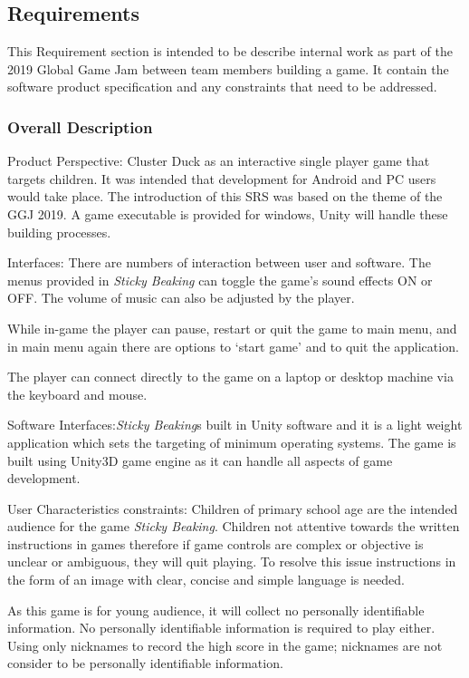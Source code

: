 \documentclass[12pt]{article}
\newcommand{\game}[2]{\textit{#1}}{}
\begin{document}
\subsection{Requirements}
This Requirement section is intended to be describe internal work as part of the 2019 Global Game Jam between team members building a game. It contain the software product specification and any constraints that need to be addressed. \cite{SRS}

\subsubsection{Overall Description}
Product Perspective: Cluster Duck as an interactive single player game that targets children. It was intended that development for Android and PC users would take place. The introduction of this SRS was based on the theme of the GGJ 2019. A game executable is provided for windows, Unity will handle these building processes.

Interfaces: There are numbers of interaction between user and software. The menus provided in \game{Sticky Beaking}{ } can toggle the game's sound effects ON or OFF. The volume of music can also be adjusted by the player. 

While in-game  the player can pause, restart or quit the game to main menu, and in main menu again there are options to `start game' and to quit the application. 

The player can connect directly to the game on a laptop or desktop machine via the keyboard and mouse.

Software Interfaces:\game{Sticky Beaking} is built in Unity software and it is a light weight application which sets the targeting of minimum operating systems. The game is built using Unity3D game engine as it can handle all aspects of game development.

User Characteristics constraints: Children of primary school age are the intended audience for the game \game{Sticky Beaking}{}. Children not attentive towards the written instructions in games therefore if game controls are complex or objective is unclear or ambiguous, they will quit playing. To resolve this issue instructions in the form of an image with clear, concise and simple language is needed.

As this game is for young audience, it will collect no personally identifiable information. No personally identifiable information is required to play either. Using only nicknames to record the high score in the game; nicknames are not consider to be personally identifiable information.
\end{document}
